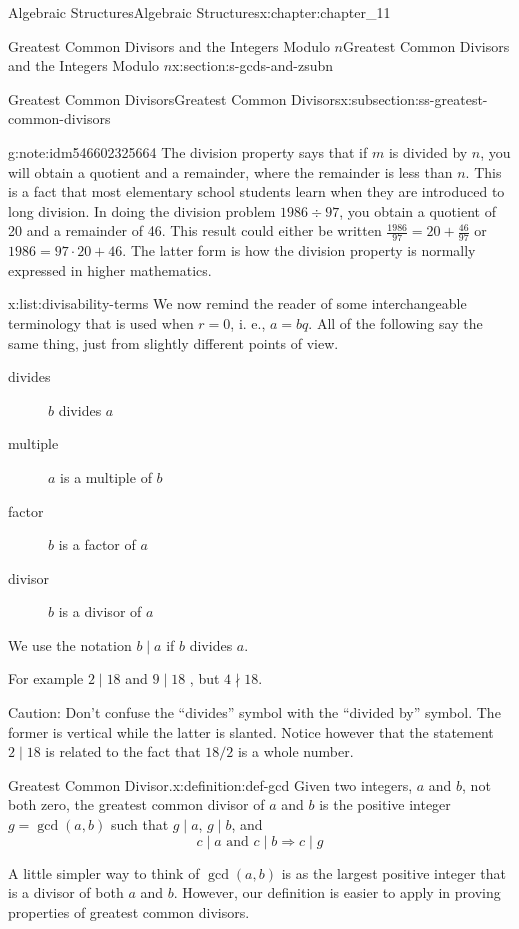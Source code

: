 \documentclass[oneside,10pt,]{book}
\numberwithin{equation}{section}
\begin{document}
\begin{chapterptx}{Algebraic Structures}{}{Algebraic Structures}{}{}{x:chapter:chapter_11}
\begin{sectionptx}{Greatest Common Divisors  and the Integers Modulo \(n\)}{}{Greatest Common Divisors  and the Integers Modulo \(n\)}{}{}{x:section:s-gcds-and-zsubn}
\begin{subsectionptx}{Greatest Common Divisors}{}{Greatest Common Divisors}{}{}{x:subsection:ss-greatest-common-divisors}
\begin{note}{}{g:note:idm546602325664}
The division property says that if \(m\) is divided by \(n\), you will obtain a quotient and a remainder, where the remainder is less than \(n\). This is a fact that most elementary school students learn when they are introduced to long division. In doing the division problem \(1986 \div  97\), you obtain a quotient of 20 and a remainder of 46.  This result could either be written \(\frac{1986}{97}= 20+\frac{46}{97}\) or  \(1986 = 97\cdot 20 + 46\).  The latter form is how the division property is normally expressed in higher mathematics.%
\end{note}
\begin{listptx}{\textbf{}}{x:list:divisability-terms}{}%
We now remind the reader of some interchangeable terminology that is used when \(r=0\), i. e.,  \(a = b q\).  All of the following say the same thing, just from slightly different points of view.%
%
\begin{description}
\item[{divides}]\(b\) divides \(a\)%
\item[{multiple}]\(a\) is a multiple of \(b\)%
\item[{factor}]\(b\) is a factor of \(a\)%
\item[{divisor}]\(b\) is a divisor of \(a\)%
\end{description}
We use the notation   \(b \mid a\)  if  \(b\)  divides \(a\).%
\end{listptx}%
For example  \(2\mid 18\)   and \(9\mid 18\) , but  \(4\nmid 18\).%
\par
Caution:  Don't confuse the ``divides'' symbol with the ``divided by'' symbol.  The former is vertical while the latter is slanted.   Notice however that the statement \(2 \mid 18\) is related to the fact that \(18/2\) is a whole number.%
\begin{definition}{Greatest Common Divisor.}{x:definition:def-gcd}%
%
\label{g:notation:idm546602307520}%
Given two integers, \(a\) and \(b\), not both zero, the greatest common divisor of \(a\) and \(b\) is the positive integer \(g=\gcd(a,b)\) such that  \(g \mid a\),  \(g\mid b\), and%
\begin{equation*}
c\mid a \textrm{ and } c \mid b \Rightarrow c \mid g
\end{equation*}
%
\end{definition}
A little simpler way to think of \(\gcd(a,b)\) is as the largest positive integer that is a divisor of both \(a\) and \(b\).  However, our definition is easier to apply in proving properties of greatest common divisors.%

\end{subsectionptx}
\end{sectionptx}
\end{chapterptx}
\end{document}
